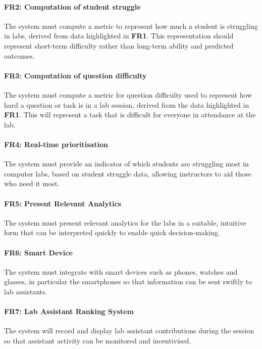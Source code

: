 \paragraph{FR2: Computation of student struggle}
The system must compute a metric to represent how much a student is struggling in labs, derived from data highlighted in \textbf{FR1}. This representation should represent short-term difficulty rather than long-term ability and predicted outcomes.

\paragraph{FR3: Computation of  question difficulty}
The system must compute a metric for question difficulty used to represent how hard a question or task is in a lab session, derived from the data highlighted in \textbf{FR1}. This will represent a task that is difficult for everyone in attendance at the lab.

\paragraph{FR4: Real-time prioritisation}
The system must provide an indicator of which students are struggling most in computer labs, based on student struggle data, allowing instructors to aid those who need it most.

\paragraph{FR5: Present Relevant Analytics}
The system must present relevant analytics for the labs in a suitable, intuitive form that can be interpreted quickly to enable quick decision-making.

\paragraph{FR6: Smart Device}
The system must integrate with smart devices such as phones, watches and glasses, in particular the smartphones so that information can be sent swiftly to lab assistants.

\paragraph{FR7: Lab Assistant Ranking System}
The system will record and display lab assistant contributions during the session so that assistant activity can be monitored and incentivised.


